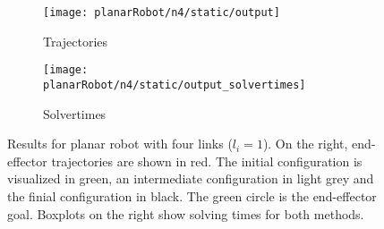 \begin{figure}
  \begin{subfigure}[]{0.5\textwidth}
  \begin{center}
    \texttt{[image: planarRobot/n4/static/output]}
  \end{center}
  \caption{Trajectories}
  \label{fig:planarRobot_n4_static_trajectories}
  \end{subfigure}%
  \begin{subfigure}[]{0.5\textwidth}
  \begin{center}
    \texttt{[image: planarRobot/n4/static/output\_solvertimes]}
  \end{center}
  \caption{Solvertimes}
  \label{fig:planarRobot_n4_static_solvertimes}
  \end{subfigure}
  \caption{Results for planar robot with four links ($l_i = 1$). On the right,
end-effector trajectories are shown in red. The initial configuration is visualized in
green, an intermediate configuration in light grey and the finial configuration in black.
The green circle is the end-effector goal. Boxplots on the right show solving times for
both methods.}%
  \label{fig:planarRobot_n4_static}
\end{figure}

\iffalse
\begin{figure}
  \begin{subfigure}[]{0.5\textwidth}
  \begin{center}
    \texttt{[image: planarRobot/n4/dynamic/output]}
  \end{center}
  \caption{Trajectories}
  \label{fig:planarRobot_n5_dynamic_trajectories}
  \end{subfigure}%
  \begin{subfigure}[]{0.5\textwidth}
  \begin{center}
    \texttt{[image: planarRobot/n4/dynamic/output\_solvertimes]}
  \end{center}
  \caption{Solvertimes}
  \label{fig:planarRobot_n4_dynamic_solvertimes}
  \end{subfigure}
  \caption{Results for planar robot with four links using basic splines as global
guidance. Both methods allow following the global path. Solvertimes (right) highlight the
difference between fabric and MPC.}%
  \label{fig:planarRobot_n4_dynamic}
\end{figure}
\fi

